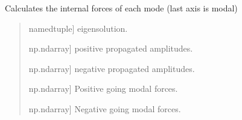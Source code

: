 \documentclass[letterpaper,10pt,english]{sphinxmanual}
\begin{document}
\begin{fulllineitems}
\label{\detokenize{core:pywfe.core.forced_problem.calculate_modal_forces}}
\pysigstartsignatures
{}
\pysigstopsignatures
\sphinxAtStartPar
Calculates the internal forces of each mode (last axis is modal)
\begin{quote}\begin{description}
\begin{description}
\sphinxlineitem{\sphinxstylestrong{eigensolution}}{[}namedtuple{]}
\sphinxAtStartPar
eigensolution.

\sphinxlineitem{\sphinxstylestrong{b\_plus}}{[}np.ndarray{]}
\sphinxAtStartPar
positive propagated amplitudes.

\sphinxlineitem{\sphinxstylestrong{b\_minus}}{[}np.ndarray{]}
\sphinxAtStartPar
negative propagated amplitudes.

\end{description}

\begin{description}
\sphinxlineitem{\sphinxstylestrong{f\_j\_plus}}{[}np.ndarray{]}
\sphinxAtStartPar
Positive going modal forces.

\sphinxlineitem{\sphinxstylestrong{f\_j\_minus}}{[}np.ndarray{]}
\sphinxAtStartPar
Negative going modal forces.

\end{description}

\end{description}\end{quote}

\end{fulllineitems}


\sphinxstepscope
\end{document}
